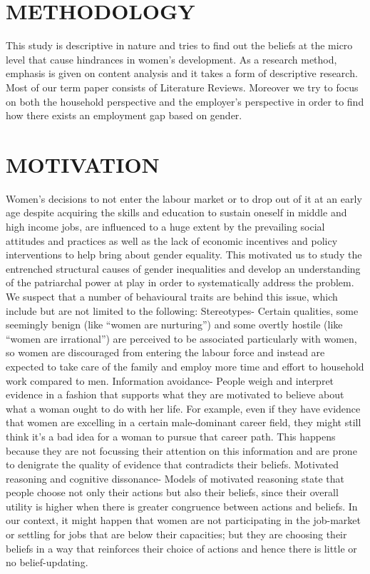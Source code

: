 \documentclass[12pt]{article}
\begin{document}
\section{METHODOLOGY}
This study is descriptive in nature and tries to find out the beliefs at the micro level that cause
hindrances in women's development. As a research method, emphasis is given on content
analysis and it takes a form of descriptive research. Most of our term paper consists of
Literature Reviews. Moreover we try to focus on both the household perspective and the
employer’s perspective in order to find how there exists an employment gap based on gender.

\section{MOTIVATION}
Women’s decisions to not enter the labour market or to drop out of it at an early age despite
acquiring the skills and education to sustain oneself in middle and high income jobs, are
influenced to a huge extent by the prevailing social attitudes and practices as well as the lack
of economic incentives and policy interventions to help bring about gender equality. This
motivated us to study the entrenched structural causes of gender inequalities and develop an
understanding of the patriarchal power at play in order to systematically address the problem.
We suspect that a number of behavioural traits are behind this issue, which include but are not
limited to the following: Stereotypes- Certain qualities, some seemingly benign (like “women
are nurturing”) and some overtly hostile (like “women are irrational”) are perceived to be
associated particularly with women, so women are discouraged from entering the labour
force and instead are expected to take care of the family and employ more time and effort to
household work compared to men. Information avoidance- People weigh and interpret
evidence in a fashion that supports what they are motivated to believe about what a woman
ought to do with her life. For example, even if they have evidence that women are excelling
in a certain male-dominant career field, they might still think it’s a bad idea for a woman to
pursue that career path. This happens because they are not focussing their attention on this
information and are prone to denigrate the quality of evidence that contradicts their beliefs.
Motivated reasoning and cognitive dissonance- Models of motivated reasoning state that
people choose not only their actions but also their beliefs, since their overall utility is higher
when there is greater congruence between actions and beliefs. In our context, it might happen
that women are not participating in the job-market or settling for jobs that are below their
capacities; but they are choosing their beliefs in a way that reinforces their choice of actions
and hence there is little or no belief-updating.
\end{document}
